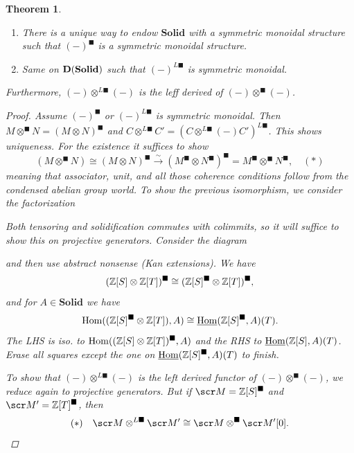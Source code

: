 \documentclass[A4paper, british, reqno]{amsart}
\theoremstyle{darkgreentheorem}
\newtheorem{thm}{Theorem}[section]
\theoremstyle{darkbluedefinition}
\theoremstyle{darkredexample}
\theoremstyle{remark}
\DeclareMathOperator{\Hom}{Hom}
\DeclareMathOperator{\Cond}{Cond}
\DeclareMathOperator{\ihom}{\underline{Hom}}
\newcommand{\Solid}{\mathbf{Solid}}
\newcommand{\1}{\mathbbm{1}}
\newcommand{\ot}{\otimes}
\newcommand{\tms}{\times}
\newcommand{\solid}{^{\blacksquare}}
\newcommand{\dsolid}{^{L\blacksquare}}
\begin{document}
\begin{thm}
    \begin{enumerate}
	\item There is a unique way to endow $\Solid$ with a symmetric monoidal structure such that $(-)\solid$ is a symmetric monoidal structure.
	\item Same on $\D(\Solid)$ such that $(-)\dsolid$ is symmetric monoidal.
    \end{enumerate}
    Furthermore, $(-)\ot\dsolid (-)$ is the leff derived of $(-)\ot\solid(-)$.
    \begin{proof}
	Assume $(-)\solid$ or $(-)\dsolid$ is symmetric monoidal.
	Then $M\ot\solid N=(M\ot N)\solid$ and $C\ot\dsolid C'=(C\ot\dsolid(-)C')\dsolid$.
	This shows uniqueness.
	For the existence it suffices to show
	\[ (M\ot\solid N)\cong (M\ot N)\solid\xrightarrow{\sim} (M\solid\ot N\solid)\solid=M\solid\ot\solid N\solid, \quad (*)\]
	meaning that associator, unit, and all those coherence conditions follow from the condensed abelian group world.
	To show the previous isomorphism, we consider the factorization
	\begin{center}
	\end{center}
	Both tensoring and solidification commutes with colimmits, so it will suffice to show this on projective generators.
	Consider the diagram
	\begin{center}
	\end{center}
	and then use abstract nonsense (Kan extensions).
	We have
	\[(\Z[S]\ot \Z[T])\solid \cong (\Z[S]\solid\ot \Z[T])\solid,\]
	and for $A\in \Solid$ we have
	\[ \Hom((\Z[S]\solid \ot \Z[T]),A)\cong \ihom(\Z[S]\solid,A)(T).\]
	The LHS is iso. to $\Hom((\Z[S]\ot \Z[T])\solid,A)$ and the RHS to $\ihom(\Z[S],A)(T)$.
	Erase all squares except the one on $\ihom(\Z[S]\solid,A)(T)$ to finish.
	
	To show that $(-)\ot\dsolid (-)$ is the left derived functor of $(-)\ot\solid(-)$, we reduce again to projective generators.
	But if $\M=\Z[S]\solid $ and $\M'=\Z[T]\solid$, then
	\[ (*)\quad \M\ot\dsolid\M'\cong \M\ot\solid \M'[0].\]
    \end{proof}
\end{thm}
\end{document}
